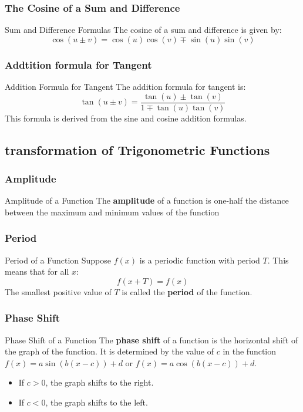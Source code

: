 \documentclass{beamer}
\begin{document}
\begin{frame}
    \frametitle{The Cosine of a Sum and Difference}
    \begin{block}{Sum and Difference Formulas}
        The cosine of a sum and difference is given by:
        \[
        \cos( u \pm v) = \cos(u)\cos(v) \mp \sin(u)\sin(v)
        \]
    \end{block}
\end{frame}

\begin{frame}
    \frametitle{Addtition formula for Tangent}
    \begin{block}{Addition Formula for Tangent} 
        The addition formula for tangent is:
        \[
        \tan(u \pm v) = \frac{\tan(u) \pm \tan(v)}{1 \mp \tan(u)\tan(v)}
        \]
        This formula is derived from the sine and cosine addition formulas.
    \end{block}
\end{frame}

\subsection{transformation of Trigonometric Functions}
\begin{frame}
    \frametitle{Amplitude}
    \begin{block}{Amplitude of a Function}
        The \textbf{amplitude} of a function is one-half the distance between the maximum and minimum values of the function
    \end{block}
\end{frame}

\begin{frame}
    \frametitle{Period}
    \begin{block}{Period of a Function}
       Suppose \(f(x)\) is a periodic function with period \(T\). This means that for all \(x\):
        \[
        f(x + T) = f(x)
        \]
        The smallest positive value of \(T\) is called the \textbf{period} of the function.     
    \end{block}
\end{frame}
\begin{frame}
    \frametitle{Phase Shift}
    \begin{block}{Phase Shift of a Function}
        The \textbf{phase shift} of a function is the horizontal shift of the graph of the function. It is determined by the value of \(c\) in the function \(f(x) = a \sin(b(x - c)) + d\) or \(f(x) = a \cos(b(x - c)) + d\).
    \end{block}
    \begin{itemize}
        \item If \(c > 0\), the graph shifts to the right.
        \item If \(c < 0\), the graph shifts to the left.
    \end{itemize}
\end{frame}
\end{document}
